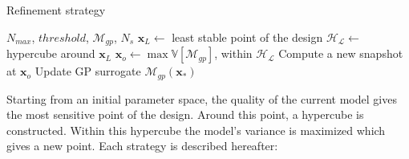 \begin{algorithm}
  \caption{Refinement strategy}
  \label{alg:refine}
  \begin{algorithmic}[1]
  \Require $N_{max}$, $threshold$, $\mathcal{M}_{gp}$, $N_s$
    \State $\mathbf{x}_{L} \gets$ least stable point of the design
    \State $\mathcal{H_{L}} \gets$ hypercube around $\mathbf{x}_{L}$
    \State $\mathbf{x}_o \gets \max \mathbb{V}[\mathcal{M}_{gp}]$, within $\mathcal{H_{L}}$
    \State Compute a new snapshot at $\mathbf{x}_o$
    \State Update GP surrogate $\mathcal{M}_{gp}(\mathbf{x}_*)$
  \EndWhile
  \end{algorithmic}
\end{algorithm}

Starting from an initial parameter space, the quality of the current model gives the most sensitive point of the design. Around this point, a hypercube is constructed. Within this hypercube the model's variance is maximized which gives a new point. Each strategy is described hereafter:

